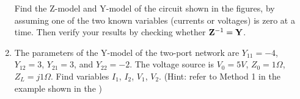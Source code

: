 \begin{enumerate}
Find the Z-model and Y-model of the circuit shown in the figures, by
assuming one of the two known variables (currents or voltages) is zero at
a time. Then verify your results by checking whether ${\bf Z}^{-1}={\bf Y}$.


% 

\item The parameters of the Y-model of the two-port network are $Y_{11}=-4$, 
$Y_{12}=3$, $Y_{21}=3$, and $Y_{22}=-2$. The voltage source is $V_0=5V$, 
$Z_0=1\Omega$, $Z_L=j1\Omega$. Find variables $I_1$, $I_2$, $V_1$, $V_2$. 
(Hint: refer to Method 1 in the example shown in the
)



\end{enumerate}
